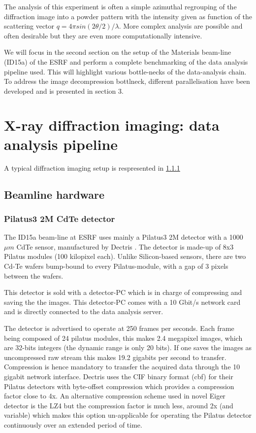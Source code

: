 \documentclass[preprint, pdf]{iucr}              %
\begin{document}
The analysis of this experiment is often a simple azimuthal regrouping of the
diffraction image into a powder pattern with the intensity given as function of
the scattering vector $q=4 \pi sin (2\theta/2)/\lambda$. 
More complex analysis are possible and often desirable but they are even more
computationally intensive.

We will focus in the second section on the setup of the Materials beam-line
(ID15a) of the ESRF and perform a complete benchmarking of the data analysis 
pipeline used. 
This will highlight various bottle-necks of the data-analysis chain.
To address the image decompression bottlneck, different parallelisation
have been developed and is presented in section 3. 

\section{X-ray diffraction imaging: data analysis pipeline}

A typical diffraction imaging setup is respresented in \ref{}


\subsection{Beamline hardware}

\subsubsection{Pilatus3 2M CdTe detector}

The ID15a beam-line at ESRF uses mainly a Pilatus3 2M detector with a 1000 $\mu
m$ CdTe sensor, manufactured by Dectris \cite{dectris}. 
The detector is made-up of 8x3 Pilatus modules (100 kilopixel each).
Unlike Silicon-based sensors, there are two Cd-Te wafers bump-bound to every
Pilatus-module, with a gap of 3 pixels between the wafers.

This detector is sold with a detector-PC which is in charge of compressing and
saving the the images. 
This detector-PC comes with a 10 Gbit/s network card and is directly connected
to the data analysis server.

The detector is advertised to operate at 250 frames per seconds. 
Each frame being composed of 24 pilatus modules, this makes 2.4 megapixel
images, which are 32-bits integers (the dynamic range is only 20 bits).
If one saves the images as uncompressed raw stream this makes 19.2 gigabits per
second to transfer.
Compression is hence mandatory to transfer the acquired data through the 10
gigabit network interface.
Dectris uses the CIF binary format (cbf) \cite{cbf} for their Pilatus detectors
with byte-offset compression which provides a compression factor close to 4x. 
An alternative compression scheme used in novel Eiger detector is the LZ4 but
the compression factor is much less, around 2x (and variable) which makes
this option un-applicable for operating the Pilatus detector continuously over
an extended period of time.
\end{document}
